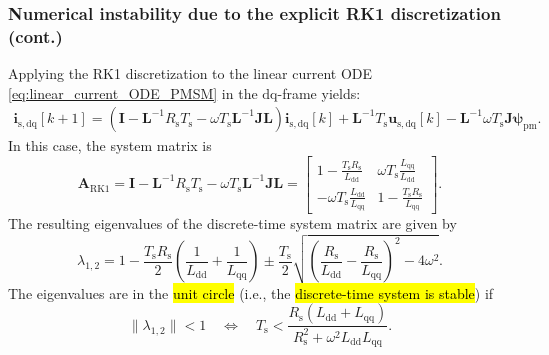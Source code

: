 \begin{frame}
    \frametitle{Numerical instability due to the explicit RK1 discretization (cont.)}
    Applying the RK1 discretization to the linear current ODE \eqref{eq:linear_current_ODE_PMSM} in the $\mathrm{dq}$-frame yields:
    \begin{equation}
        \begin{split}
            \bm{i}_\mathrm{s,dq}[k+1] = \left(\bm{I} - \bm{L}^{-1}R_\mathrm{s}T_\mathrm{s}-\omega T_\mathrm{s}\bm{L}^{-1}\bm{J}\bm{L}\right)\bm{i}_\mathrm{s,dq}[k] + \bm{L}^{-1}T_\mathrm{s}\bm{u}_\mathrm{s,dq}[k] - \bm{L}^{-1}\omega T_\mathrm{s}\bm{J}\bm{\psi}_\mathrm{pm}.
        \end{split}
    \end{equation}\pause%
    In this case, the system matrix is
    \begin{equation}
        \bm{A}_{\text{RK1}} = \bm{I} - \bm{L}^{-1}R_\mathrm{s}T_\mathrm{s}-\omega T_\mathrm{s}\bm{L}^{-1}\bm{J}\bm{L} = \begin{bmatrix}
            1-\frac{T_\mathrm{s}R_\mathrm{s}}{L_{\mathrm{dd}}}          & \omega T_\mathrm{s}\frac{L_{\mathrm{qq}}}{L_{\mathrm{dd}}} \\[1ex]
            -\omega T_\mathrm{s}\frac{L_{\mathrm{dd}}}{L_{\mathrm{qq}}} & 1-\frac{T_\mathrm{s}R_\mathrm{s}}{L_{\mathrm{qq}}}
        \end{bmatrix}.
    \end{equation}\pause%
    The resulting eigenvalues of the discrete-time system matrix are given by
    \begin{equation}
        \lambda_{1,2} = 1 - \frac{T_\mathrm{s}R_\mathrm{s}}{2}\left(\frac{1}{L_{\mathrm{dd}}}+\frac{1}{L_{\mathrm{qq}}}\right) \pm \frac{T_\mathrm{s}}{2}\sqrt{\left(\frac{R_\mathrm{s}}{L_{\mathrm{dd}}}-\frac{R_\mathrm{s}}{L_{\mathrm{qq}}}\right)^2 - 4\omega^2}.
    \end{equation}\pause%
    The eigenvalues are in the \hl{unit circle} (i.e., the \hl{discrete-time system is stable}) if
    \begin{equation}
        \|\lambda_{1,2}\| < 1 \quad \Leftrightarrow \quad T_\mathrm{s} < \frac{R_\mathrm{s}\left(L_{\mathrm{dd}} + L_{\mathrm{qq}}\right)}{R_\mathrm{s}^2 + \omega^2 L_{\mathrm{dd}}L_{\mathrm{qq}}}.
        \label{eq:eigenvalues_RK1_PMSM_model_linear_magn}
    \end{equation}
\end{frame}

